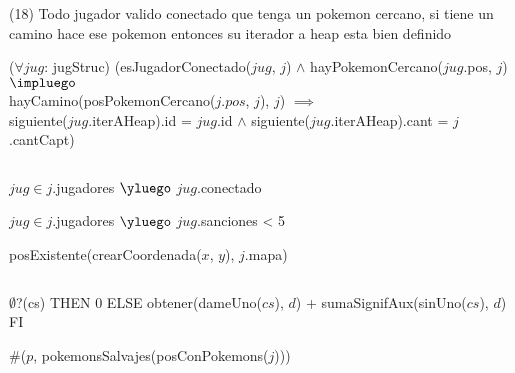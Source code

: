 \begin{Representacion}
$ $\newline

(18) Todo jugador valido conectado que tenga un pokemon cercano, si tiene un camino hace ese pokemon entonces su iterador a heap esta bien definido $ $\newline

($\forall jug$: jugStruc) (esJugadorConectado($jug$, $j$) $\land$ hayPokemonCercano($jug$.pos, $j$) $\impluego$ \\
hayCamino(posPokemonCercano($j.pos$, $j$), $j$) $\implies$ \\
siguiente($jug$.iterAHeap).id = $jug$.id $\land$ siguiente($jug$.iterAHeap).cant = $j$.cantCapt) 

$ $\newline



%
{$jug \in j$.jugadores $\yluego$ $jug$.conectado} 
$ $\newline

%
{$jug \in j$.jugadores $\yluego$ $jug$.sanciones < 5} 
$ $\newline

%
{posExistente(crearCoordenada($x$, $y$), $j$.mapa)}
$ $\newline

%
$ $\newline

%
{\IF $\emptyset$?(cs) THEN 0 ELSE obtener(dameUno($cs$), $d$) + sumaSignifAux(sinUno($cs$), $d$) FI} 
$ $\newline

%
{$\#$($p$, pokemonsSalvajes(posConPokemons($j$)))} 
$ $\newline


\end{Representacion}
